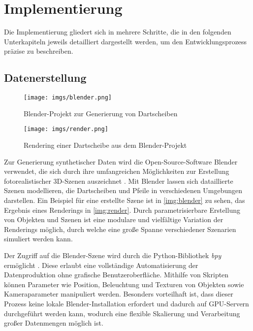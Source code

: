 \section{Implementierung}
\label{sec:implementierung}
Die Implementierung gliedert sich in mehrere Schritte, die in den folgenden Unterkapiteln jeweils detailliert dargestellt werden, um den Entwicklungsprozess präzise zu beschreiben.

\subsection{Datenerstellung}
\label{sec:implementierung:datenerstellung}

\begin{figure}
    \centering
    \texttt{[image: imgs/blender.png]}
    \caption{Blender-Projekt zur Generierung von Dartscheiben}
    \label{img:blender}
\end{figure}

\begin{figure}
    \centering
    \texttt{[image: imgs/render.png]}
    \caption{Rendering einer Dartscheibe aus dem Blender-Projekt}
    \label{img:render}
\end{figure}

Zur Generierung synthetischer Daten wird die Open-Source-Software Blender verwendet, die sich durch ihre umfangreichen Möglichkeiten zur Erstellung fotorealistischer 3D-Szenen auszeichnet \cite{blender}. Mit Blender lassen sich dataillierte Szenen modellieren, die Dartscheiben und Pfeile in verschiedenen Umgebungen darstellen. Ein Beispiel für eine erstellte Szene ist in \autoref{img:blender} zu sehen, das Ergebnis eines Renderings in \autoref{img:render}. Durch parametrisierbare Erstellung von Objekten und Szenen ist eine modulare und vielfältige Variation der Renderings möglich, durch welche eine große Spanne verschiedener Szenarien simuliert werden kann.

Der Zugriff auf die Blender-Szene wird durch die Python-Bibliothek \textit{bpy} ermöglicht \cite{bpy}. Diese erlaubt eine vollständige Automatisierung der Datenproduktion ohne grafische Benutzeroberfläche. Mithilfe von Skripten können Parameter wie Position, Beleuchtung und Texturen von Objekten sowie Kameraparameter manipuliert werden. Besonders vorteilhaft ist, dass dieser Prozess keine lokale Blender-Installation erfordert und dadurch auf GPU-Servern durchgeführt werden kann, wodurch eine flexible Skalierung und Verarbeitung großer Datenmengen möglich ist.

